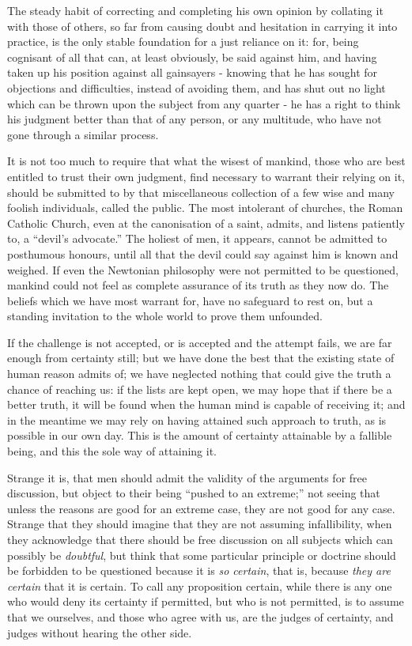 The steady habit of correcting and completing his own opinion by collating it with those of others, so far from causing doubt and hesitation in carrying it into practice, is the only stable foundation for a just reliance on it: for, being cognisant of all that can, at least obviously, be said against him, and having taken up his position against all gainsayers - knowing that he has sought for objections and difficulties, instead of avoiding them, and has shut out no light which can be thrown upon the subject from any quarter - he has a right to think his judgment better than that of any person, or any multitude, who have not gone through a similar process.\par

It is not too much to require that what the wisest of mankind, those who are best entitled to trust their own judgment, find necessary to warrant their relying on it, should be submitted to by that miscellaneous collection of a few wise and many foolish individuals, called the public. The most intolerant of churches, the Roman Catholic Church, even at the canonisation of a saint, admits, and listens patiently to, a “devil’s advocate.” The holiest of men, it appears, cannot be admitted to posthumous honours, until all that the devil could say against him is known and weighed. If even the Newtonian philosophy were not permitted to be questioned, mankind could not feel as complete assurance of its truth as they now do. The beliefs which we have most warrant for, have no safeguard to rest on, but a standing invitation to the whole world to prove them unfounded.\par

If the challenge is not accepted, or is accepted and the attempt fails, we are far enough from certainty still; but we have done the best that the existing state of human reason admits of; we have neglected nothing that could give the truth a chance of reaching us: if the lists are kept open, we may hope that if there be a better truth, it will be found when the human mind is capable of receiving it; and in the meantime we may rely on having attained such approach to truth, as is possible in our own day. This is the amount of certainty attainable by a fallible being, and this the sole way of attaining it.\par

Strange it is, that men should admit the validity of the arguments for free discussion, but object to their being “pushed to an extreme;” not seeing that unless the reasons are good for an extreme case, they are not good for any case. Strange that they should imagine that they are not assuming infallibility, when they acknowledge that there should be free discussion on all subjects which can possibly be \textit{doubtful}, but think that some particular principle or doctrine should be forbidden to be questioned because it is \textit{so certain}, that is, because \textit{they are certain} that it is certain. To call any proposition certain, while there is any one who would deny its certainty if permitted, but who is not permitted, is to assume that we ourselves, and those who agree with us, are the judges of certainty, and judges without hearing the other side.\par

